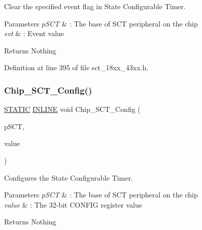Clear the specified event flag in State Configurable Timer. 


\begin{DoxyParams}{Parameters}
{\em p\+S\+CT} & \+: The base of S\+CT peripheral on the chip \\
\hline
{\em evt} & \+: Event value \\
\hline
\end{DoxyParams}
\begin{DoxyReturn}{Returns}
Nothing 
\end{DoxyReturn}


Definition at line 395 of file sct\+\_\+18xx\+\_\+43xx.\+h.

\mbox{\label{group___s_c_t__18_x_x__43_x_x_ga1c4a7a1622ec276ae01e01e8fe3ad2e6}} 
\subsubsection{\texorpdfstring{Chip\+\_\+\+S\+C\+T\+\_\+\+Config()}{Chip\_SCT\_Config()}}
{\footnotesize\ttfamily \hyperlink{group___l_p_c___types___public___macros_ga10b2d890d871e1489bb02b7e70d9bdfb}{S\+T\+A\+T\+IC} \hyperlink{spifi__18xx__43xx_8h_a2eb6f9e0395b47b8d5e3eeae4fe0c116}{I\+N\+L\+I\+NE} void Chip\+\_\+\+S\+C\+T\+\_\+\+Config (\begin{DoxyParamCaption}\item[{\hyperlink{struct_l_p_c___s_c_t___t}{L\+P\+C\+\_\+\+S\+C\+T\+\_\+T} $\ast$}]{p\+S\+CT,  }\item[{uint32\+\_\+t}]{value }\end{DoxyParamCaption})}



Configures the State Configurable Timer. 


\begin{DoxyParams}{Parameters}
{\em p\+S\+CT} & \+: The base of S\+CT peripheral on the chip \\
\hline
{\em value} & \+: The 32-\/bit C\+O\+N\+F\+IG register value \\
\hline
\end{DoxyParams}
\begin{DoxyReturn}{Returns}
Nothing 
\end{DoxyReturn}


